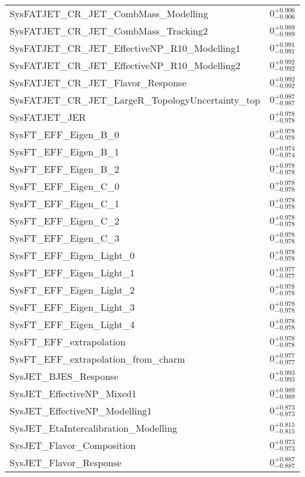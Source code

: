 \begin{tabular}{|l|c|}
SysFATJET\_CR\_JET\_CombMass\_Modelling & $0^{+0.906}_{-0.906}$ \\
SysFATJET\_CR\_JET\_CombMass\_Tracking2 & $0^{+0.989}_{-0.989}$ \\
SysFATJET\_CR\_JET\_EffectiveNP\_R10\_Modelling1 & $0^{+0.991}_{-0.991}$ \\
SysFATJET\_CR\_JET\_EffectiveNP\_R10\_Modelling2 & $0^{+0.992}_{-0.992}$ \\
SysFATJET\_CR\_JET\_Flavor\_Response & $0^{+0.992}_{-0.992}$ \\
SysFATJET\_CR\_JET\_LargeR\_TopologyUncertainty\_top & $0^{+0.987}_{-0.987}$ \\
SysFATJET\_JER & $0^{+0.978}_{-0.978}$ \\
SysFT\_EFF\_Eigen\_B\_0 & $0^{+0.978}_{-0.978}$ \\
SysFT\_EFF\_Eigen\_B\_1 & $0^{+0.974}_{-0.974}$ \\
SysFT\_EFF\_Eigen\_B\_2 & $0^{+0.978}_{-0.978}$ \\
SysFT\_EFF\_Eigen\_C\_0 & $0^{+0.978}_{-0.978}$ \\
SysFT\_EFF\_Eigen\_C\_1 & $0^{+0.978}_{-0.978}$ \\
SysFT\_EFF\_Eigen\_C\_2 & $0^{+0.978}_{-0.978}$ \\
SysFT\_EFF\_Eigen\_C\_3 & $0^{+0.978}_{-0.978}$ \\
SysFT\_EFF\_Eigen\_Light\_0 & $0^{+0.978}_{-0.978}$ \\
SysFT\_EFF\_Eigen\_Light\_1 & $0^{+0.977}_{-0.977}$ \\
SysFT\_EFF\_Eigen\_Light\_2 & $0^{+0.978}_{-0.978}$ \\
SysFT\_EFF\_Eigen\_Light\_3 & $0^{+0.978}_{-0.978}$ \\
SysFT\_EFF\_Eigen\_Light\_4 & $0^{+0.978}_{-0.978}$ \\
SysFT\_EFF\_extrapolation & $0^{+0.978}_{-0.978}$ \\
SysFT\_EFF\_extrapolation\_from\_charm & $0^{+0.977}_{-0.977}$ \\
SysJET\_BJES\_Response & $0^{+0.993}_{-0.993}$ \\
SysJET\_EffectiveNP\_Mixed1 & $0^{+0.989}_{-0.989}$ \\
SysJET\_EffectiveNP\_Modelling1 & $0^{+0.873}_{-0.873}$ \\
SysJET\_EtaIntercalibration\_Modelling & $0^{+0.815}_{-0.815}$ \\
SysJET\_Flavor\_Composition & $0^{+0.973}_{-0.973}$ \\
SysJET\_Flavor\_Response & $0^{+0.887}_{-0.887}$ \\

\end{tabular}
